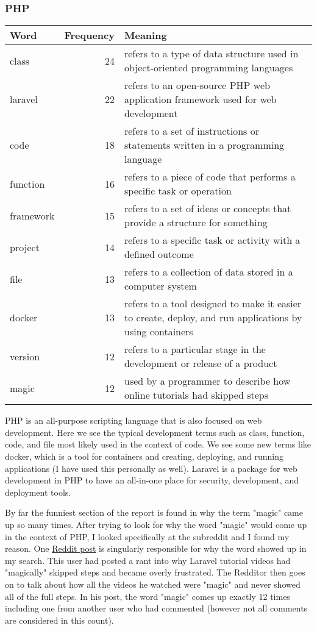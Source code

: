 \documentclass{article}
\theoremstyle{theorem}
\theoremstyle{definition}
\theoremstyle{remark}
\begin{document}
\subsubsection{PHP}
\begin{tabular}{ | l | r | p{7cm} | }
\hline
Word & Frequency & Meaning \\
\hline
class & 24 & refers to a type of data structure used in object-oriented programming languages \\
\hline
laravel & 22 & refers to an open-source PHP web application framework used for web development \\
\hline
code & 18 & refers to a set of instructions or statements written in a programming language \\
\hline
function & 16 & refers to a piece of code that performs a specific task or operation \\
\hline
framework & 15 & refers to a set of ideas or concepts that provide a structure for something \\
\hline
project & 14 & refers to a specific task or activity with a defined outcome \\
\hline
file & 13 & refers to a collection of data stored in a computer system \\
\hline
docker & 13 & refers to a tool designed to make it easier to create, deploy, and run applications by using containers \\
\hline
version & 12 & refers to a particular stage in the development or release of a product \\
\hline
magic & 12 & used by a programmer to describe how online tutorials had skipped steps \\
\hline
\end{tabular}

\medskip
PHP is an all-purpose scripting language that is also focused on web development. Here we see the typical development terms such as class, function, code, and file most likely used in the context of code. We see some new terms like docker, which is a tool for containers and creating, deploying, and running applications (I have used this personally as well). Laravel is a package for web development in PHP to have an all-in-one place for security, development, and deployment tools.

\medskip
By far the funniest section of the report is found in why the term "magic" came up so many times. After trying to look for why the word "magic" would come up in the context of PHP, I looked specifically at the subreddit and I found my reason. One \href{https://www.reddit.com/r/PHP/comments/zkresf/looking_for_intermediate_laravel_tutorial/}{Reddit post} is singularly responsible for why the word showed up in my search. This user had posted a rant into why Laravel tutorial videos had "magically" skipped steps and became overly frustrated. The Redditor then goes on to talk about how all the videos he watched were "magic" and never showed all of the full steps. In his post, the word "magic" comes up exactly 12 times including one from another user who had commented (however not all comments are considered in this count).
\end{document}

